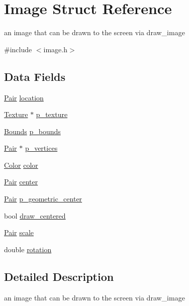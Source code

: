 \hypertarget{struct_image}{\section{Image Struct Reference}
\label{struct_image}
}


an image that can be drawn to the screen via draw\-\_\-image  




{\ttfamily \#include $<$image.\-h$>$}

\subsection*{Data Fields}
\begin{DoxyCompactItemize}
\item 
\hyperlink{struct_pair}{Pair} \hyperlink{struct_image_a3e80df7db427d8af97de2329f82da3fb}{location}
\item 
\hyperlink{struct_texture}{Texture} $\ast$ \hyperlink{struct_image_a6ee2052d785bd48fad50f16e1501c9e6}{p\-\_\-texture}
\item 
\hyperlink{struct_bounds}{Bounds} \hyperlink{struct_image_ade93faba09657b26b66db12a95c7a344}{p\-\_\-bounds}
\item 
\hyperlink{struct_pair}{Pair} $\ast$ \hyperlink{struct_image_af5c8a308476f59471d0587235811c054}{p\-\_\-vertices}
\item 
\hyperlink{struct_color}{Color} \hyperlink{struct_image_a0d78100d523c9211a4f6c85bbd18d146}{color}
\item 
\hyperlink{struct_pair}{Pair} \hyperlink{struct_image_a533074775f8f6b07101b68a2a85fe617}{center}
\item 
\hyperlink{struct_pair}{Pair} \hyperlink{struct_image_aba183bc46eecd0f94b610522badb6503}{p\-\_\-geometric\-\_\-center}
\item 
bool \hyperlink{struct_image_a9338994b3f7570b780df3ec53ecad2c1}{draw\-\_\-centered}
\item 
\hyperlink{struct_pair}{Pair} \hyperlink{struct_image_a9dc95c6e2e8ed8db87a6422bdea7f282}{scale}
\item 
double \hyperlink{struct_image_a5343f2a6b580fa15a341909a6d73583e}{rotation}
\end{DoxyCompactItemize}


\subsection{Detailed Description}
an image that can be drawn to the screen via draw\-\_\-image 

